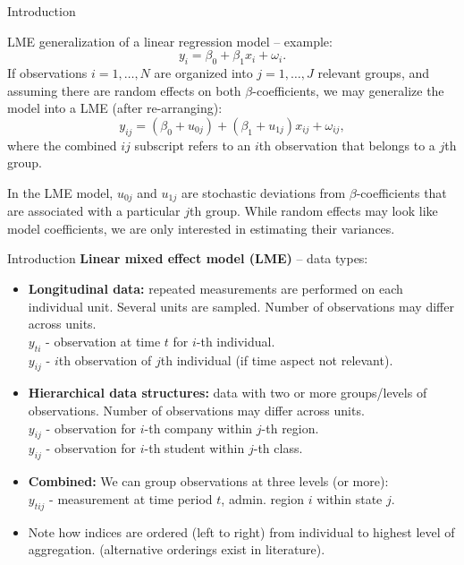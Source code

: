 \documentclass{beamer}
\begin{document}
\begin{frame}{Introduction}

LME generalization of a linear regression model -- example: 
$$y_i = \beta_0 + \beta_1 x_i + \omega_i.$$ 
If observations $i=1,\dots,N$ are organized into $j=1,\dots,J$ relevant groups, and assuming there are random effects on both $\beta$-coefficients, we may generalize the model into a LME (after re-arranging):
$$y_{ij} = (\beta_0 + u_{0j}) + (\beta_1 + u_{1j}) x_{ij} + \omega_{ij},$$
where the combined $ij$ subscript refers to an $i$th observation that belongs to a $j$th group. 

\medskip
In the LME model, $u_{0j}$ and $u_{1j}$ are stochastic deviations from $\beta$-coefficients that are associated with a particular $j$th group. While random effects may look like model coefficients, we are only interested in estimating their variances. 
\end{frame}
\begin{frame}{Introduction}
\small 
\textbf{Linear mixed effect model (LME)} -- data types:
\medskip
\begin{itemize}
\item \textbf{Longitudinal data:} repeated measurements are performed on each individual  unit. Several units are sampled. Number of observations may differ across units.\\ \smallskip
\quad $y_{ti}$ - observation at time $t$ for $i$-th individual. \\  
\quad $y_{ij}$ - $i$th observation of $j$th individual (if time aspect not relevant). \\ 
\bigskip
\item \textbf{Hierarchical data structures:} data with two or more groups/levels of observations. Number of observations may differ across units.\\ \smallskip
\quad $y_{ij}$ - observation for $i$-th company within $j$-th region. \\ 
\quad $y_{ij}$ - observation for $i$-th student within $j$-th class. \\ 
\medskip
\bigskip
\item \textbf{Combined:} We can group observations at three levels (or more):\\
\smallskip
\quad $y_{tij}$ - measurement at time period $t$, admin. region $i$ within state $j$.\\ 
\bigskip
\item Note how indices are ordered (left to right) from individual to highest level of aggregation. (alternative orderings exist in literature).
\end{itemize}
\end{frame}
\end{document}
